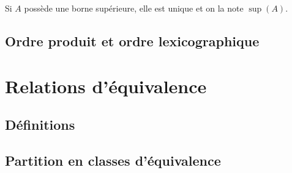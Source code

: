 \begin{proposition}
Si $A$ possède une borne supérieure, elle est unique et on la note $\sup(A)$.
\end{proposition}

\subsection{Ordre produit et ordre lexicographique}

\section{Relations d'équivalence}

\subsection{Définitions}

\subsection{Partition en classes d'équivalence}